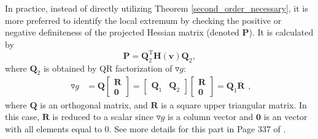 \documentclass{elsarticle}
\begin{document}
In  practice, instead of  directly utilizing  Theorem 
\ref{second_order_necessary},  
it  is  more  preferred to  identify the  local  extremum  by  checking  the  positive or negative  definiteness of  the  projected  Hessian  matrix (denoted 
$\mathbf P 
$).  
It  is  calculated  by  
\begin{equation}\label{Pmatrix}
\mathbf P = 
\mathbf Q_{2}^{\mathrm T}
\mathbf H(\mathbf  v) 
\mathbf Q_{2},  
\end{equation}
where 
$  \mathbf Q_{2} $ is  obtained by
QR  factorization of   $     \triangledown  g $:
\begin{equation}\label{QR_factor}
\begin{split}
\triangledown  g
&=\mathbf Q
\begin{bmatrix}
\mathbf R   \\
\mathbf 0
\end{bmatrix} =
\begin{bmatrix}
\mathbf Q_{1}  &   \mathbf Q_{2}
\end{bmatrix}
\begin{bmatrix}
\mathbf R  \\
\mathbf 0
\end{bmatrix}
=\mathbf Q_{1}
\mathbf R
\end{split},
\end{equation}
where 
$  \mathbf Q $ 
is   an     
orthogonal  matrix, and $ \mathbf R$ is a square upper triangular matrix. 
In this  case, 
$ \mathbf R$ is  reduced  to  a  scalar  since  
$ \triangledown  g $  is  a  column  vector  and  
$\mathbf 0$ is  an    vector  with  all  elements  equal to 0.  
See more  details for  this  part in  Page 337 of  \cite{Numerical}. 
\end{document}
